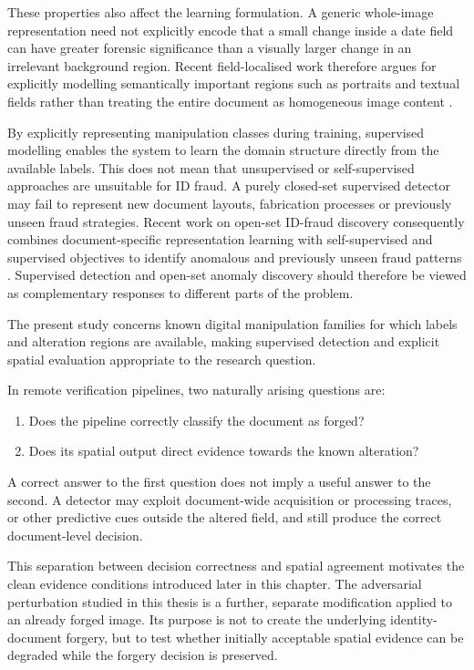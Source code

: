 These properties also affect the learning formulation. A generic whole-image representation need not explicitly encode that a small change inside a date field can have greater forensic significance than a visually larger change in an irrelevant background region. Recent field-localised work therefore argues for explicitly modelling semantically important regions such as portraits and textual fields rather than treating the entire document as homogeneous image content \citep{kumar2026flid}. 

By explicitly representing manipulation classes during training, supervised modelling enables the system to learn the domain structure directly from the available labels. This does not mean that unsupervised or self-supervised approaches are unsuitable for ID fraud. A purely closed-set supervised detector may fail to represent new document layouts, fabrication processes or previously unseen fraud strategies. Recent work on open-set ID-fraud discovery consequently combines document-specific representation learning with self-supervised and supervised objectives to identify anomalous and previously unseen fraud patterns \citep{li2026layoutaware}. Supervised detection and open-set anomaly discovery should therefore be viewed as complementary responses to different parts of the problem. 

The present study concerns known digital manipulation families for which labels and alteration regions are available, making supervised detection and explicit spatial evaluation appropriate to the research question. 

In remote verification pipelines, two naturally arising questions are: 
\begin{enumerate} [itemsep=1pt]
\item Does the pipeline correctly classify the document as forged? 
\item Does its spatial output direct evidence towards the known alteration? 
\end{enumerate} 

A correct answer to the first question does not imply a useful answer to the second. A detector may exploit document-wide acquisition or processing traces, or other predictive cues outside the altered field, and still produce the correct document-level decision. 

This separation between decision correctness and spatial agreement motivates the clean evidence conditions introduced later in this chapter. The adversarial perturbation studied in this thesis is a further, separate modification applied to an already forged image. Its purpose is not to create the underlying identity-document forgery, but to test whether initially acceptable spatial evidence can be degraded while the forgery decision is preserved.

